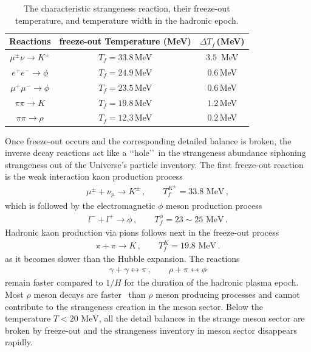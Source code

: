 \documentclass[universe,article,submit,moreauthors,pdftex,a4paper]{Definitions/mdpi}
\newcommand{\MeV}{\text{ MeV}}
\begin{document}
\begin{table}[ht]
\caption{The characteristic strangeness reaction, their freeze-out temperature, and temperature width in the hadronic epoch.}
\label{FreezeoutTemperature_table} 
\centering
\begin{tabular}{c| c| c}
\hline\hline
Reactions &freeze-out Temperature (MeV) & {$\Delta T_f$\,(MeV)} \\
\hline
$\mu^\pm\nu\rightarrow K^\pm$ & $T_f=33.8$\,MeV & {$3.5$ \,MeV}\\ 
\hline
$e^+e^-\rightarrow \phi$ & $T_f=24.9$\,MeV &{$0.6$\,MeV}\\
$\mu^+\mu^-\rightarrow\phi$ & $T_f=23.5$\,MeV &{$0.6$\,MeV}\\
\hline
 $\pi\pi\rightarrow K$ & $T_f=19.8$\,MeV&{$1.2$\,MeV}\\
\hline
$\pi\pi\rightarrow\rho$ & $T_f=12.3$\,MeV&{$0.2$\,MeV}\\
\hline\hline
\end{tabular}
\end{table}

Once freeze-out occurs and the corresponding detailed balance is broken, the inverse decay reactions act like a \lq\lq hole\rq\rq\ in the strangeness abundance siphoning strangeness out of the Universe's particle inventory. The first freeze-out reaction is the weak interaction kaon production process
\begin{align}
    \mu^\pm+\nu_{\mu}\rightarrow K^\pm\,,\qquad T_f^{K^\pm}=33.8\MeV\,,
\end{align}
which is followed by the electromagnetic $\phi$ meson production process
\begin{align}
    l^-+l^+\rightarrow\phi\,,\qquad T_f^\phi=23\sim25\MeV\,.
\end{align}
Hadronic kaon production via pions follows next in the freeze-out process
\begin{align}
    \pi+\pi\rightarrow K\,,\qquad T_f^K=19.8\MeV\,.
\end{align}
as it becomes slower than the Hubble expansion. The reactions
\begin{align}
    \gamma+\gamma\leftrightarrow\pi\,,\qquad\rho+\pi\leftrightarrow\phi
\end{align}
remain faster compared to $1/H$ for the duration of the hadronic plasma epoch. Most $\rho$ meson decays are faster~\cite{ParticleDataGroup:2018ovx} than $\rho$ meson producing processes and cannot contribute to the strangeness creation in the meson sector. Below the temperature $T<20\MeV$, all the detail balances in the strange meson sector are broken by freeze-out and the strangeness inventory in meson sector disappears rapidly.
\end{document}
